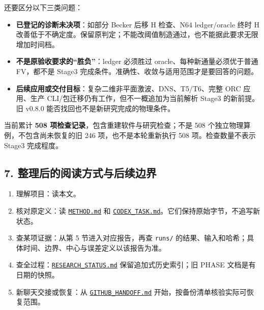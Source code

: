 \documentclass[
  10pt,
  a4paper,
]{article}
\providecommand{\tightlist}{%
  \setlength{\itemsep}{0pt}\setlength{\parskip}{0pt}}
\begin{document}
还要区分以下三类问题：

\begin{itemize}
\tightlist
\item
  \textbf{已登记的诊断未决项}：如部分 Becker 后移 H 检查、N64
  ledger/oracle 终时 H
  改善低于不确定度。保留原判定；不能改阈值制造通过，也不能据此要求无限增加时间档。
\item
  \textbf{不是原验收要求的``胜负''}：ledger 必须胜过
  oracle、每种新通量必须优于普通 FV，都不是 Stage3
  完成条件。准确性、收敛与适用范围才是要回答的问题。
\item
  \textbf{后续应用或交付目标}：复杂二维非平面激波、DNS、T5/T6、完整 ORC
  应用、生产 CLI/包迁移仍有工作，但不一概追加为当前解析 Stage3
  的新前提。旧 v0.8.0 能否找回也不是新研究完成的物理条件。
\end{itemize}

当前累计 \textbf{508 项检查记录}，包含重建软件与研究检查；不是 508
个独立物理算例，不包含尚未恢复的旧 246 项，也不是本轮重新执行 508
项。检查数量不表示 Stage3 完成程度。

\subsection{7.
整理后的阅读方式与后续边界}\label{ux6574ux7406ux540eux7684ux9605ux8bfbux65b9ux5f0fux4e0eux540eux7eedux8fb9ux754c}

\begin{enumerate}
\def\labelenumi{\arabic{enumi}.}
\tightlist
\item
  理解项目：读本文。
\item
  核对原定义：读
  \href{https://github.com/hongjianli97/diffuse-mixing/blob/main/docs/METHOD.md}{\nolinkurl{METHOD.md}}
  和
  \href{https://github.com/hongjianli97/diffuse-mixing/blob/main/docs/CODEX_TASK.md}{\nolinkurl{CODEX_TASK.md}}。它们保持原始字节，不追写新状态。
\item
  查某项证据：从第 5 节进入对应报告，再查 \nolinkurl{runs/}
  的结果、输入和哈希；具体时间、边界、中心与误差定义以该报告为准。
\item
  查全过程：\href{https://github.com/hongjianli97/diffuse-mixing/blob/main/docs/RESEARCH_STATUS.md}{\nolinkurl{RESEARCH_STATUS.md}}
  保留追加式历史索引；旧 PHASE 文档是有日期的快照。
\item
  新聊天交接或恢复：从
  \href{https://github.com/hongjianli97/diffuse-mixing/blob/main/GITHUB_HANDOFF.md}{\nolinkurl{GITHUB_HANDOFF.md}}
  开始，按备份清单核验实际可恢复范围。
\end{enumerate}
\end{document}
